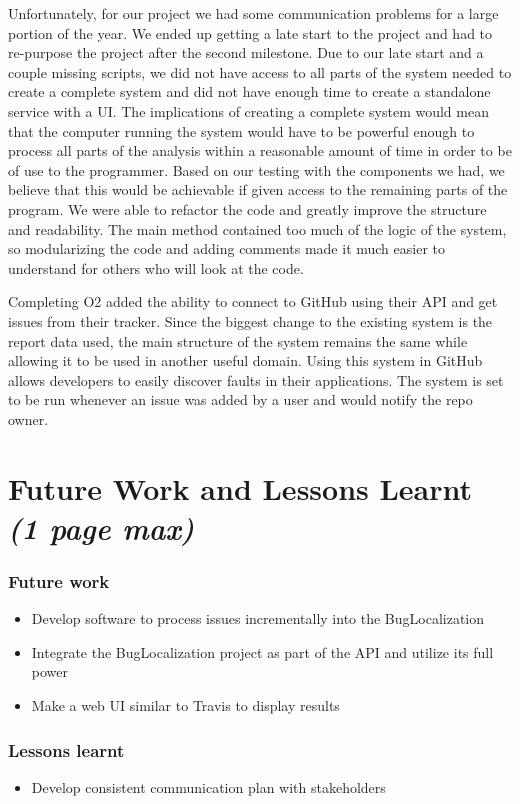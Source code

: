 \documentclass[12pt]{article}
\providecommand{\tightlist}{%
  \setlength{\itemsep}{0pt}\setlength{\parskip}{0pt}}
\begin{document}
Unfortunately, for our project we had some communication problems for a
large portion of the year. We ended up getting a late start to the
project and had to re-purpose the project after the second milestone.
Due to our late start and a couple missing scripts, we did not have
access to all parts of the system needed to create a complete system and
did not have enough time to create a standalone service with a UI. The
implications of creating a complete system would mean that the computer
running the system would have to be powerful enough to process all parts
of the analysis within a reasonable amount of time in order to be of use
to the programmer. Based on our testing with the components we had, we
believe that this would be achievable if given access to the remaining
parts of the program. We were able to refactor the code and greatly
improve the structure and readability. The main method contained too
much of the logic of the system, so modularizing the code and adding
comments made it much easier to understand for others who will look at
the code.

Completing O2 added the ability to connect to GitHub using their API and
get issues from their tracker. Since the biggest change to the existing
system is the report data used, the main structure of the system remains
the same while allowing it to be used in another useful domain. Using
this system in GitHub allows developers to easily discover faults in
their applications. The system is set to be run whenever an issue was
added by a user and would notify the repo owner.

\hypertarget{future-work-and-lessons-learnt-1-page-max}{%
\section{\texorpdfstring{Future Work and Lessons Learnt \emph{(1 page
max)}}{Future Work and Lessons Learnt (1 page max)}}\label{future-work-and-lessons-learnt-1-page-max}}

\hypertarget{future-work}{%
\subsubsection{Future work}\label{future-work}}

\begin{itemize}
\tightlist
\item
  Develop software to process issues incrementally into the
  BugLocalization
\item
  Integrate the BugLocalization project as part of the API and utilize
  its full power
\item
  Make a web UI similar to Travis to display results
\end{itemize}

\hypertarget{lessons-learnt}{%
\subsubsection{Lessons learnt}\label{lessons-learnt}}

\begin{itemize}
\tightlist
\item
  Develop consistent communication plan with stakeholders
\end{itemize}



\end{document}

